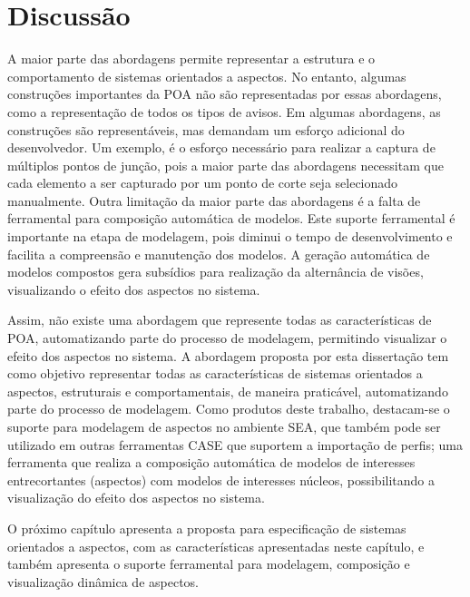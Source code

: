 \section{Discussão}

A maior parte das abordagens permite representar a estrutura e o comportamento de sistemas orientados a aspectos. No entanto, algumas construções
importantes da POA não são representadas por essas abordagens, como a representação de todos os tipos de avisos. Em algumas abordagens, as construções
são representáveis, mas demandam um esforço adicional do desenvolvedor. Um exemplo, é o esforço necessário para realizar a captura de múltiplos pontos
de junção, pois a maior parte das abordagens necessitam que cada elemento a ser capturado por um ponto de corte seja selecionado manualmente. Outra
limitação da maior parte das abordagens é a falta de ferramental para composição automática de modelos. Este suporte ferramental é importante na
etapa de modelagem, pois diminui o tempo de desenvolvimento e facilita a compreensão e manutenção dos modelos. A geração automática de modelos
compostos gera subsídios para realização da alternância de visões, visualizando o efeito dos aspectos no sistema.

Assim, não existe uma abordagem que represente todas as características de POA, automatizando parte do processo de modelagem, permitindo visualizar o
efeito dos aspectos no sistema. A abordagem proposta por esta dissertação tem como objetivo representar todas as características de sistemas
orientados a aspectos, estruturais e comportamentais, de maneira praticável, automatizando parte do processo de modelagem. Como produtos deste trabalho, destacam-se o
suporte para modelagem de aspectos no ambiente SEA, que também pode ser utilizado em outras ferramentas CASE que suportem a importação de
perfis; uma ferramenta que realiza a composição automática de modelos de interesses entrecortantes (aspectos) com modelos de interesses
núcleos, possibilitando a visualização do efeito dos aspectos no sistema.

O próximo capítulo apresenta a proposta para especificação de sistemas orientados a aspectos, com as características apresentadas neste capítulo, e
também apresenta o suporte ferramental para modelagem, composição e visualização dinâmica de aspectos.
